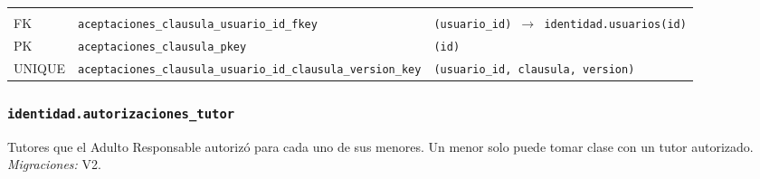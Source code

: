 {\small
\begin{xltabular}{\textwidth}{@{}>{\raggedright\arraybackslash}p{1.7cm} >{\raggedright\arraybackslash}p{4.6cm} L@{}}
    \toprule
     &  &  \\
    \midrule
    \endfirsthead
    \toprule
     &  &  \\
    \midrule
    \endhead
    \bottomrule
    \endfoot
    FK & \texttt{aceptaciones\_\allowbreak{}clausula\_\allowbreak{}usuario\_\allowbreak{}id\_\allowbreak{}fkey} & \texttt{(\allowbreak{}usuario\_\allowbreak{}id) $\rightarrow$ identidad.usuarios(\allowbreak{}id)} \\
    PK & \texttt{aceptaciones\_\allowbreak{}clausula\_\allowbreak{}pkey} & \texttt{(\allowbreak{}id)} \\
    UNIQUE & \texttt{aceptaciones\_\allowbreak{}clausula\_\allowbreak{}usuario\_\allowbreak{}id\_\allowbreak{}clausula\_\allowbreak{}version\_\allowbreak{}key} & \texttt{(\allowbreak{}usuario\_\allowbreak{}id,\allowbreak{} clausula,\allowbreak{} version)} \\
\end{xltabular}
}

\subsubsection{\texorpdfstring{\texttt{identidad.autorizaciones\_\allowbreak{}tutor}}{identidad.autorizaciones\_tutor}}\label{dd:identidad.autorizaciones_tutor}

Tutores que el Adulto Responsable autorizó para cada uno de sus menores. Un menor solo puede tomar clase con un tutor autorizado. \emph{Migraciones:} V2.


